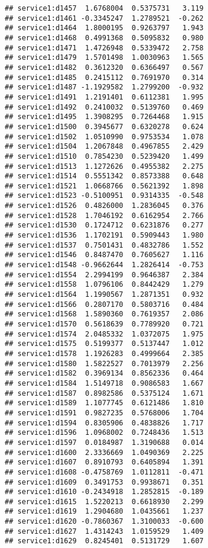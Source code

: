 \documentclass[
]{article}
\begin{document}
\begin{verbatim}
## service1:d1457  1.6768004  0.5375731   3.119
## service1:d1461 -0.3345247  1.2789521  -0.262
## service1:d1464  1.8000195  0.9263797   1.943
## service1:d1468  0.4991368  0.5095832   0.980
## service1:d1471  1.4726948  0.5339472   2.758
## service1:d1479  1.5701498  1.0030963   1.565
## service1:d1482  0.3612320  0.6366497   0.567
## service1:d1485  0.2415112  0.7691970   0.314
## service1:d1487 -1.1929582  1.2799200  -0.932
## service1:d1491  1.2191401  0.6112381   1.995
## service1:d1492  0.2410032  0.5139760   0.469
## service1:d1495  1.3908295  0.7264468   1.915
## service1:d1500  0.3945677  0.6320278   0.624
## service1:d1502  1.0510990  0.9753534   1.078
## service1:d1504  1.2067848  0.4967855   2.429
## service1:d1510  0.7854230  0.5239420   1.499
## service1:d1513  1.1272626  0.4955382   2.275
## service1:d1514  0.5551342  0.8573388   0.648
## service1:d1521  1.0668766  0.5621392   1.898
## service1:d1523 -0.5100951  0.9314335  -0.548
## service1:d1526  0.4826000  1.2836045   0.376
## service1:d1528  1.7046192  0.6162954   2.766
## service1:d1530  0.1724712  0.6231876   0.277
## service1:d1536  1.1702191  0.5909443   1.980
## service1:d1537  0.7501431  0.4832786   1.552
## service1:d1546  0.8487470  0.7605627   1.116
## service1:d1548 -0.9662644  1.2826414  -0.753
## service1:d1554  2.2994199  0.9646387   2.384
## service1:d1558  1.0796106  0.8442429   1.279
## service1:d1564  1.1990567  1.2871351   0.932
## service1:d1566  0.2807170  0.5803716   0.484
## service1:d1568  1.5890360  0.7619357   2.086
## service1:d1570  0.5618639  0.7789920   0.721
## service1:d1574  2.0485332  1.0372075   1.975
## service1:d1575  0.5199377  0.5137447   1.012
## service1:d1578  1.1926283  0.4999664   2.385
## service1:d1580  1.5822527  0.7013979   2.256
## service1:d1582  0.3969134  0.8562336   0.464
## service1:d1584  1.5149718  0.9086583   1.667
## service1:d1587  0.8982586  0.5375124   1.671
## service1:d1589  1.1077745  0.6121486   1.810
## service1:d1591  0.9827235  0.5768006   1.704
## service1:d1594  0.8305906  0.4838826   1.717
## service1:d1596  1.0968002  0.7248436   1.513
## service1:d1597  0.0184987  1.3190688   0.014
## service1:d1600  2.3336669  1.0490369   2.225
## service1:d1607  0.8910793  0.6405894   1.391
## service1:d1608 -0.4758769  1.0112811  -0.471
## service1:d1609  0.3491753  0.9938671   0.351
## service1:d1610 -0.2434918  1.2852815  -0.189
## service1:d1615  1.5220213  0.6618930   2.299
## service1:d1619  1.2904680  1.0435661   1.237
## service1:d1620 -0.7860367  1.3100033  -0.600
## service1:d1627  1.4314243  1.0159529   1.409
## service1:d1629  0.8245401  0.5131729   1.607

\end{verbatim}
\end{document}
